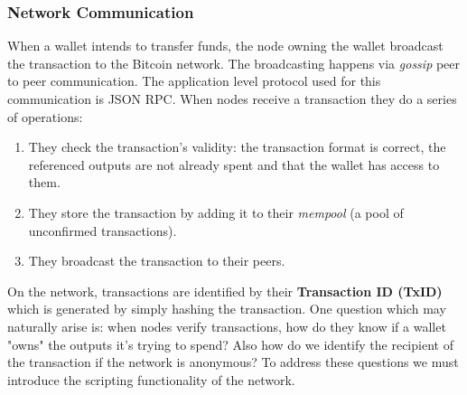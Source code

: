 \subsubsection{Network Communication}
When a wallet intends to transfer funds, the node owning the wallet broadcast the transaction to the Bitcoin network.
The broadcasting happens via \textit{gossip} peer to peer communication. The application level protocol used
for this communication is JSON RPC.
When nodes receive a transaction they do a series of operations:
\begin{enumerate}
  \item They check the transaction's validity: the transaction format is correct, the referenced outputs are
    not already spent and that the wallet has access to them.
  \item They store the transaction by adding it to their \textit{mempool} (a pool of unconfirmed transactions).
  \item They broadcast the transaction to their peers.
\end{enumerate}
On the network, transactions are identified by their \textbf{Transaction ID (TxID)} which is generated by
simply hashing the transaction.
One question which may naturally arise is: when nodes verify transactions, how do they know if a wallet
"owns" the outputs it's trying to spend?
Also how do we identify the recipient of the transaction if the network is anonymous?
To address these questions we must introduce the scripting functionality of the network.

